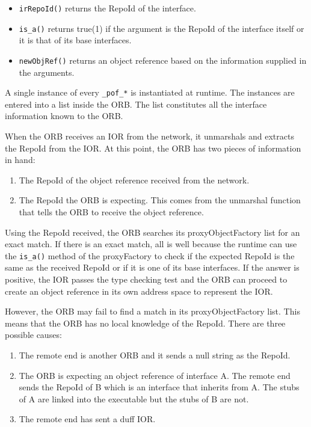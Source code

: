\documentclass[11pt,twoside,a4paper]{book}
\newcommand{\type}[1]{\texttt{#1}}
\newcommand{\op}[1]{\texttt{#1()}}
\begin{document}
\begin{itemize}
\item \op{irRepoId} returns the RepoId of the interface.
\item \op{is\_a} returns true(1) if the argument is the RepoId of the
interface itself or it is that of its base interfaces.

\item \op{newObjRef} returns an object reference based on the
information supplied in the arguments.
\end{itemize}

A single instance of every \type{\_pof\_*} is instantiated at runtime.
The instances are entered into a list inside the ORB. The list
constitutes all the interface information known to the ORB.

When the ORB receives an IOR from the network, it unmarshals and
extracts the RepoId from the IOR. At this point, the ORB has two
pieces of information in hand:

\begin{enumerate}
\item The RepoId of the object reference received from the network.
\item The RepoId the ORB is expecting. This comes from the unmarshal
      function that tells the ORB to receive the object reference.
\end{enumerate}

Using the RepoId received, the ORB searches its proxyObjectFactory
list for an exact match. If there is an exact match, all is well
because the runtime can use the \op{is\_a} method of the proxyFactory
to check if the expected RepoId is the same as the received RepoId or
if it is one of its base interfaces. If the answer is positive, the
IOR passes the type checking test and the ORB can proceed to create an
object reference in its own address space to represent the IOR.

However, the ORB may fail to find a match in its proxyObjectFactory
list. This means that the ORB has no local knowledge of the RepoId.
There are three possible causes:

\begin{enumerate}
\item The remote end is another ORB and it sends a null string as the RepoId.
\item The ORB is expecting an object reference of interface A. The remote
      end sends the RepoId of B which is an interface that inherits from A.
      The stubs of A are linked into the executable but the stubs of B are
      not.
\item The remote end has sent a duff IOR.
\end{enumerate}
\end{document}
